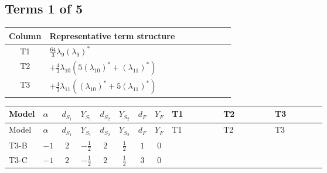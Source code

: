 \documentclass[8pt]{article}
\begin{document}
\begin{landscape}
\subsection*{Terms 1 of 5}
\begin{center}
\begin{tabular}{@{}c >{\raggedright\arraybackslash}p{0.82\linewidth}@{}}
\toprule
Column & Representative term structure \\
\midrule
T1 & \(\displaystyle \frac{64}{3} {\lambda_9} \left({\lambda_9}\right)^{*}\) \\
\midrule
T2 & \(\displaystyle +\frac{4}{3} {\lambda_{10}} (5 \left({\lambda_{10}}\right)^{*}+\left({\lambda_{11}}\right)^{*})\) \\
\midrule
T3 & \(\displaystyle +\frac{4}{3} {\lambda_{11}} (\left({\lambda_{10}}\right)^{*}+5 \left({\lambda_{11}}\right)^{*})\) \\
\midrule
\bottomrule
\end{tabular}
\end{center}
\smallskip
\tiny
\begin{longtable}{@{}llcccccc >{\raggedright\arraybackslash}p{0.21\linewidth} >{\raggedright\arraybackslash}p{0.21\linewidth} >{\raggedright\arraybackslash}p{0.21\linewidth}@{}}
\toprule
Model & $\alpha$ & $d_{S_1}$ & $Y_{S_1}$ & $d_{S_2}$ & $Y_{S_2}$ & $d_F$ & $Y_F$ & T1 & T2 & T3 \\
\midrule
\endfirsthead
\toprule
Model & $\alpha$ & $d_{S_1}$ & $Y_{S_1}$ & $d_{S_2}$ & $Y_{S_2}$ & $d_F$ & $Y_F$ & T1 & T2 & T3 \\
\midrule
\endhead
T3-B & $-1$ & $2$ & $-\frac{1}{2}$ & $2$ & $\frac{1}{2}$ & $1$ & $0$ & \scriptsize\adjustbox{max width=\linewidth}{$\begin{gathered} \frac{64}{3} {\lambda_9} \left({\lambda_9}\right)^{*}\end{gathered}$} & \scriptsize\adjustbox{max width=\linewidth}{$\begin{gathered} +\frac{4}{3} {\lambda_{10}} (5 \left({\lambda_{10}}\right)^{*}+\left({\lambda_{11}}\right)^{*})\end{gathered}$} & \scriptsize\adjustbox{max width=\linewidth}{$\begin{gathered} +\frac{4}{3} {\lambda_{11}} (\left({\lambda_{10}}\right)^{*}+5 \left({\lambda_{11}}\right)^{*})\end{gathered}$} \\
\midrule
T3-C & $-1$ & $2$ & $-\frac{1}{2}$ & $2$ & $\frac{1}{2}$ & $3$ & $0$ & \scriptsize\adjustbox{max width=\linewidth}{$\begin{gathered} \frac{64}{3} {\lambda_9} \left({\lambda_9}\right)^{*}\end{gathered}$} & \scriptsize\adjustbox{max width=\linewidth}{$\begin{gathered} +\frac{4}{3} {\lambda_{10}} (5 \left({\lambda_{10}}\right)^{*}+\left({\lambda_{11}}\right)^{*})\end{gathered}$} & \scriptsize\adjustbox{max width=\linewidth}{$\begin{gathered} +\frac{4}{3} {\lambda_{11}} (\left({\lambda_{10}}\right)^{*}+5 \left({\lambda_{11}}\right)^{*})\end{gathered}$} \\

\end{longtable}
\end{landscape}
\end{document}
